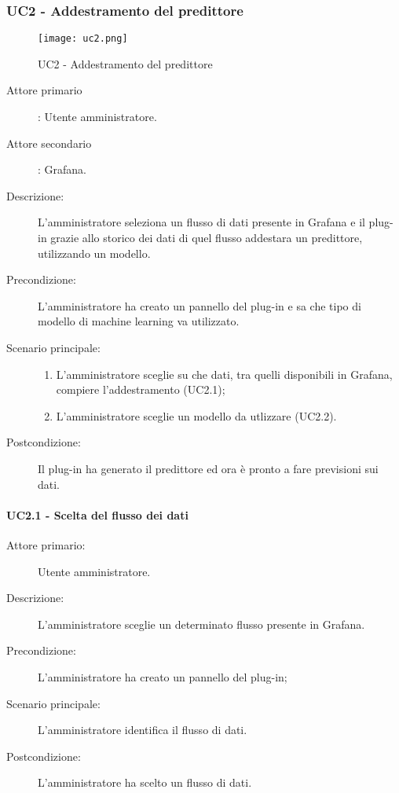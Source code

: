 \newpage
\subsubsection{UC2 - Addestramento del predittore}
\label{sssec:uc2}

\begin{figure}[h!]
  \begin{center}
    \texttt{[image: uc2.png]}\\
    \caption{UC2 - Addestramento del predittore}%
    \label{fig:uc2}
  \end{center}
\end{figure}

\begin{description}
  \item[Attore primario]: Utente amministratore.
  \item[Attore secondario]: Grafana.
  \item[Descrizione:] L'amministratore seleziona un flusso di dati presente in Grafana e il plug-in grazie allo storico dei dati di quel flusso addestara un predittore, utilizzando un modello.
  \item[Precondizione:] L'amministratore ha creato un pannello del plug-in e sa che tipo di modello di machine learning va utilizzato.
  \item[Scenario principale:]
  \begin{enumerate}
    \item L'amministratore sceglie su che dati, tra quelli disponibili in Grafana, compiere l'addestramento (UC2.1);
    \item L'amministratore sceglie un modello da utlizzare (UC2.2).
  \end{enumerate}
  \item[Postcondizione:] Il plug-in ha generato il predittore ed ora è pronto a fare previsioni sui dati.
\end{description}

\paragraph{UC2.1 - Scelta del flusso dei dati}
\label{sssec:uc2.1}
\begin{description}
  \item[Attore primario:] Utente amministratore.
  \item[Descrizione:] L'amministratore sceglie un determinato flusso presente in Grafana.
  \item[Precondizione:] L'amministratore ha creato un pannello del plug-in;
  \item[Scenario principale:] L'amministratore identifica il flusso di dati.
  \item[Postcondizione:] L'amministratore ha scelto un flusso di dati.
\end{description}

